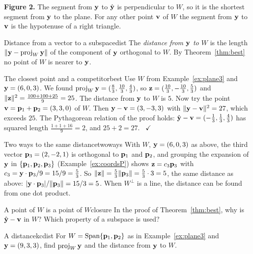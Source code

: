 \documentclass[11pt]{article}
\begin{document}
\noindent\textbf{Figure 2.} The segment from $\mathbf{y}$ to $\hat{\mathbf{y}}$ is perpendicular to $W$, so it is the shortest segment from $\mathbf{y}$ to the plane. For any other point $\mathbf{v}$ of $W$ the segment from $\mathbf{y}$ to $\mathbf{v}$ is the hypotenuse of a right triangle.

\begin{defn}{Distance from a vector to a subspace}{dist}
The \emph{distance from $\mathbf{y}$ to $W$} is the length $\lVert\mathbf{y}-\operatorname{proj}_W\mathbf{y}\rVert$ of the component of $\mathbf{y}$ orthogonal to $W$. By Theorem~\ref{thm:best} no point of $W$ is nearer to $\mathbf{y}$.
\end{defn}

\begin{exmp}{The closest point and a competitor}{best}
Use $W$ from Example~\ref{ex:plane3} and $\mathbf{y}=(6,0,3)$. We found $\operatorname{proj}_W\mathbf{y}=(\tfrac83,\tfrac{10}3,\tfrac43)$, so $\mathbf{z}=(\tfrac{10}3,-\tfrac{10}3,\tfrac53)$ and $\lVert\mathbf{z}\rVert^2=\tfrac{100+100+25}9=25$. The distance from $\mathbf{y}$ to $W$ is $5$. Now try the point $\mathbf{v}=\mathbf{p}_1+\mathbf{p}_2=(3,3,0)$ of $W$. Then $\mathbf{y}-\mathbf{v}=(3,-3,3)$ with $\lVert\mathbf{y}-\mathbf{v}\rVert^2=27$, which exceeds $25$. The Pythagorean relation of the proof holds: $\hat{\mathbf{y}}-\mathbf{v}=(-\tfrac13,\tfrac13,\tfrac43)$ has squared length $\tfrac{1+1+16}9=2$, and $25+2=27$. \ $\checkmark$
\end{exmp}

\begin{exmp}{Two ways to the same distance}{twoways}
With $W$, $\mathbf{y}=(6,0,3)$ as above, the third vector $\mathbf{p}_3=(2,-2,1)$ is orthogonal to $\mathbf{p}_1$ and $\mathbf{p}_2$, and grouping the expansion of $\mathbf{y}$ in $\{\mathbf{p}_1,\mathbf{p}_2,\mathbf{p}_3\}$ (Example~\ref{ex:coordsP}) shows $\mathbf{z}=c_3\mathbf{p}_3$ with $c_3=\mathbf{y}\cdot\mathbf{p}_3/9=15/9=\tfrac53$. So $\lVert\mathbf{z}\rVert=\tfrac53\lVert\mathbf{p}_3\rVert=\tfrac53\cdot3=5$, the same distance as above: $|\mathbf{y}\cdot\mathbf{p}_3|/\lVert\mathbf{p}_3\rVert=15/3=5$. When $W^{\perp}$ is a line, the distance can be found from one dot product.
\end{exmp}

\begin{think}{A point of $W$ is a point of $W$}{closure}
In the proof of Theorem~\ref{thm:best}, why is $\hat{\mathbf{y}}-\mathbf{v}$ in $W$? Which property of a subspace is used?
\end{think}

\begin{kc}{A distance}{kcdist}
For $W=\operatorname{Span}\{\mathbf{p}_1,\mathbf{p}_2\}$ as in Example~\ref{ex:plane3} and $\mathbf{y}=(9,3,3)$, find $\operatorname{proj}_W\mathbf{y}$ and the distance from $\mathbf{y}$ to $W$.
\end{kc}
\end{document}
